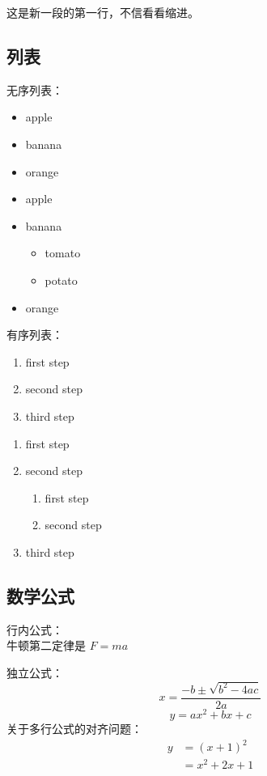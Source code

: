 \documentclass{article}
\begin{document}
这是新一段的第一行，不信看看缩进。

\subsection{列表} \label{sec:list}
无序列表：
\begin{itemize}
\item apple
\item banana
\item orange
\end{itemize}

\begin{itemize}
\item apple
\item banana
\begin{itemize}
\item tomato
\item potato
\end{itemize}
\item orange
\end{itemize}

有序列表：
\begin{enumerate}
\item first step
\item second step
\item third step
\end{enumerate}

\begin{enumerate}
\item first step
\item second step
\begin{enumerate}
\item first step
\item second step
\end{enumerate}
\item third step
\end{enumerate}

\subsection{数学公式} \label{sec:math}
行内公式： \\
牛顿第二定律是 $F=ma$

独立公式： \\
\[
x = \frac{-b \pm \sqrt{b^2-4ac}}{2a}
\]
\begin{equation}
y = ax^2 + bx + c
\end{equation}
关于多行公式的对齐问题：
\begin{align}
y&=(x+1)^2 \\      %
 &=x^2 + 2x + 1    %
\end{align}
\end{document}
